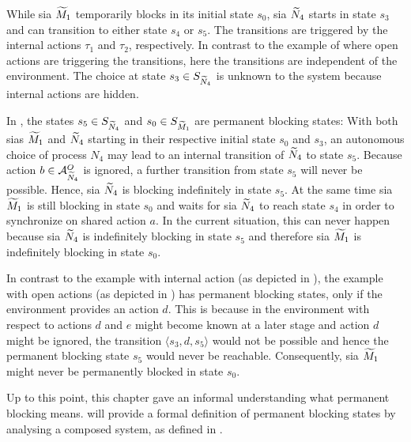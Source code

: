 While \gls{sia} $\widetilde{M}_1$ temporarily blocks in its initial state $s_0$, \gls{sia} $\widetilde{N}_4$ starts in state $s_3$ and can transition to either state $s_4$ or $s_5$.
The transitions are triggered by the internal actions $\tau_1$ and $\tau_2$, respectively.
In contrast to the example of \Fig{\ref{fig_sia_control_open}} where open actions are triggering the transitions, here the transitions are independent of the environment.
The choice at state $s_3 \in S_{\widetilde{N}_4}$ is unknown to the system because internal actions are hidden.

In \Fig{\ref{fig_sia_control_internal}}, the states $s_5 \in S_{\widetilde{N}_4}$ and $s_0 \in S_{\widetilde{M}_1}$ are permanent blocking states:
With both \glspl{sia} $\widetilde{M}_1$ and $\widetilde{N}_4$ starting in their respective initial state $s_0$ and $s_3$, an autonomous choice of process $N_4$ may lead to an internal transition of $\widetilde{N}_4$ to state $s_5$.
Because action $b \in \mathcal{A}_{\widetilde{N}_4}^O$ is ignored, a further transition from state $s_5$ will never be possible.
Hence, \gls{sia} $\widetilde{N}_4$ is blocking indefinitely in state $s_5$.
At the same time \gls{sia} $\widetilde{M}_1$ is still blocking in state $s_0$ and waits for \gls{sia} $\widetilde{N}_4$ to reach state $s_4$ in order to synchronize on shared action $a$.
In the current situation, this can never happen because \gls{sia} $\widetilde{N}_4$ is indefinitely blocking in state $s_5$ and therefore \gls{sia} $\widetilde{M}_1$ is indefinitely blocking in state $s_0$.

In contrast to the example with internal action (as depicted in \Fig{\ref{fig_sia_control_internal}}), the example with open actions (as depicted in \Fig{\ref{fig_sia_control_open}}) has permanent blocking states, only if the environment provides an action $d$.
This is because in \Fig{\ref{fig_sia_control_open}} the environment with respect to actions $d$ and $e$ might become known at a later stage and action $d$ might be ignored, the transition $\langle s_3, d, s_5 \rangle$ would not be possible and hence the permanent blocking state $s_5$ would never be reachable.
Consequently, \gls{sia} $\widetilde{M}_1$ might never be permanently blocked in state $s_0$.

Up to this point, this chapter gave an informal understanding what permanent blocking means.
\Chap{\ref{chap_block}} will provide a formal definition of permanent blocking states by analysing a composed system, as defined in \Sect{\ref{sect_sia_composition}}.

